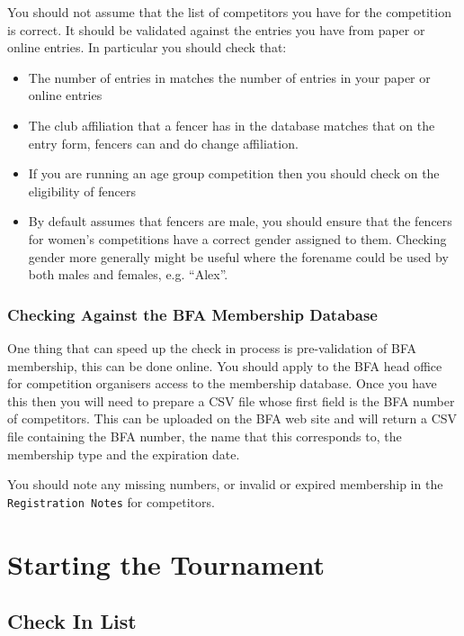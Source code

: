 \documentclass[a4paper,11pt]{memoir}
\begin{document}
You should not assume that the list of competitors you have for the competition is correct. It should be validated against the entries you have from paper or online entries. In particular you should check that:

\begin{itemize}
 \item The number of entries in \fencingtime{} matches the number of entries in your paper or online entries
 \item The club affiliation that a fencer has in the \fencingtime{} database matches that on the entry form, fencers can and do change affiliation.
 \item If you are running an age group competition then you should check on the eligibility of fencers
 \item By default \fencingtime{} assumes that fencers are male, you should ensure that the fencers for women's competitions have a correct gender assigned to them. Checking gender more generally might be useful where the forename could be used by both males and females, e.g. “Alex”.
\end{itemize}

\subsection{Checking Against the BFA Membership Database}

One thing that can speed up the check in process is pre-validation of BFA membership, this can be done online. You should apply to the BFA head office for competition organisers access to the membership database. Once you have this then you will need to prepare a CSV file whose first field is the BFA number of competitors. This can be uploaded on the BFA web site and will return a CSV file containing the BFA number, the name that this corresponds to, the membership type and the expiration date. 

You should note any missing numbers, or invalid or expired membership in the \texttt{Registration Notes} for competitors. 

\chapter{Starting the Tournament}

\section{Check In List}
\end{document}
